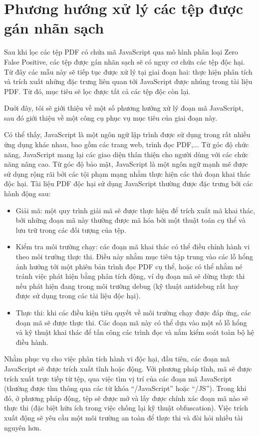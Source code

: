 \documentclass[./../main.tex]{subfiles}
\begin{document}
\section{Phương hướng xử lý các tệp được gán nhãn sạch}
Sau khi lọc các tệp PDF có chứa mã JavaScript qua mô hình phân loại Zero False Positive, các tệp được gán nhãn sạch sẽ có nguy cơ chứa các tệp độc hại. Từ đây các mẫu này sẽ tiếp tục được xử lý tại giai đoạn hai: thực hiện phân tích và trích xuất những đặc trưng liên quan tới JavaScript được nhúng trong tài liệu PDF. Từ đó, mục tiêu sẽ lọc được tất cả các tệp độc còn lại.

Duới đây, tôi sẽ giới thiệu về một số phương hướng xử lý đoạn mã JavaScript, sau đó giới thiệu về một công cụ phục vụ mục tiêu của giai đoạn này.


Có thể thấy, JavaScript là một ngôn ngữ lập trình được sử dụng trong rất nhiều ứng dụng khác nhau, bao gồm các trang web, trình đọc PDF,... Từ góc độ chức năng, JavaScript mang lại các giao diện thân thiện cho người dùng với các chức năng nâng cao. Từ góc độ bảo mật, JavaScript là một ngôn ngữ mạnh mẽ được sử dụng rộng rãi bởi các tội phạm mạng nhằm thực hiện các thủ đoạn khai thác độc hại.
Tài liệu PDF độc hại sử dụng JavaScript thường được đặc trưng bởi các hành động sau:
\begin{itemize}
	\item Giải mã: một quy trình giải mã sẽ được thực hiện để trích xuất mã khai thác, bởi những đoạn mã này thường được mã hóa bởi một thuật toán cụ thể và lưu trữ trong các đối tượng của tệp.
	\item Kiểm tra môi trường chạy: các đoạn mã khai thác có thể điều chỉnh hành vi theo môi trường thực thi. Điều này nhằm mục tiêu tập trung vào các lỗ hổng ảnh hưởng tới một phiên bản trình đọc PDF cụ thể, hoặc có thể nhằm né tránh việc phát hiện bằng phân tích động, ví dụ đoạn mã sẽ dừng thực thi nếu phát hiện đang trong môi trường debug (kỹ thuật antidebug rất hay được sử dụng trong các tài liệu độc hại).
	\item Thực thi: khi các điều kiện tiên quyết về môi trường chạy được đáp ứng, các đoạn mã sẽ được thực thi. Các đoạn mã này có thể dựa vào một số lỗ hổng và kỹ thuật khai thác để tấn công các trình đọc và nắm kiểm soát toàn bộ hệ điều hành.
\end{itemize}

Nhằm phục vụ cho việc phân tích hành vi độc hại, đầu tiên, các đoạn mã JavaScript sẽ được trích xuất tĩnh hoặc động. Với phương pháp tĩnh, mã sẽ được trích xuất trực tiếp từ tệp, qua việc tìm vị trí của các đoạn mã JavaScript (thường được tìm thông qua các từ khóa “/JavaScript” hoặc “/JS”). Trong khi đó, ở phương pháp động, tệp sẽ được mở và lấy được chính xác đoạn mã nào sẽ thực thi (đặc biệt hữu ích trong việc chống lại kỹ thuật obfuscation). Việc trích xuất động sẽ yêu cầu một môi trường an toàn để thực thi và đòi hỏi nhiều tài nguyên hơn.
\end{document}
